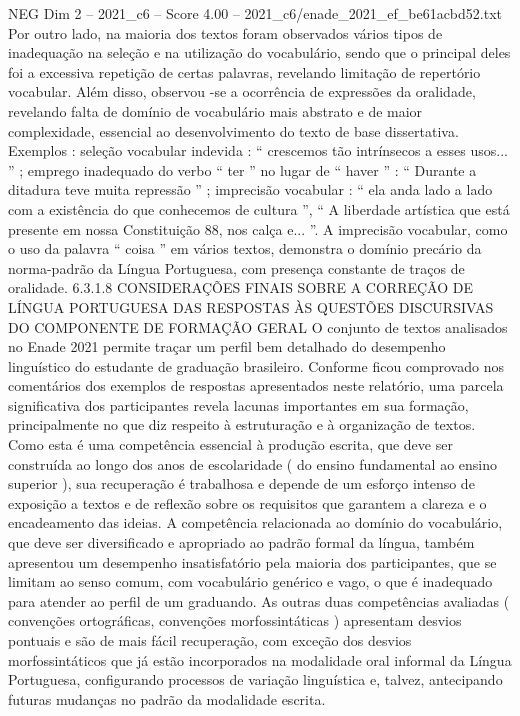 \begin{textsample}{NEG Dim 2 – 2021\_c6 – Score 4.00 – 2021\_c6/enade\_2021\_ef\_be61acbd52.txt}
Por outro lado, na maioria dos textos foram observados vários tipos de inadequação na seleção e na utilização do vocabulário, sendo que o principal deles foi a excessiva repetição de certas palavras, revelando limitação de repertório vocabular.
Além disso, observou -se a ocorrência de expressões da oralidade, revelando falta de domínio de vocabulário mais abstrato e de maior complexidade, essencial ao desenvolvimento do texto de base dissertativa.
Exemplos : seleção vocabular indevida : “ crescemos tão intrínsecos a esses usos... ” ; emprego inadequado do verbo “ ter ” no lugar de “ haver ” : “ Durante a ditadura teve muita repressão ” ; imprecisão vocabular : “ ela anda lado a lado com a existência do que conhecemos de cultura ”, “ A liberdade artística que está presente em nossa Constituição 88, nos calça e... ”.
A imprecisão vocabular, como o uso da palavra “ coisa ” em vários textos, demonstra o domínio precário da norma-padrão da Língua Portuguesa, com presença constante de traços de oralidade. 6.3.1.8 CONSIDERAÇÕES FINAIS SOBRE A CORREÇÃO DE LÍNGUA PORTUGUESA DAS RESPOSTAS ÀS QUESTÕES DISCURSIVAS DO COMPONENTE DE FORMAÇÃO GERAL O conjunto de textos analisados no Enade 2021 permite traçar um perfil bem detalhado do desempenho linguístico do estudante de graduação brasileiro.
Conforme ficou comprovado nos comentários dos exemplos de respostas apresentados neste relatório, uma parcela significativa dos participantes revela lacunas importantes em sua formação, principalmente no que diz respeito à estruturação e à organização de textos.
Como esta é uma competência essencial à produção escrita, que deve ser construída ao longo dos anos de escolaridade ( do ensino fundamental ao ensino superior ), sua recuperação é trabalhosa e depende de um esforço intenso de exposição a textos e de reflexão sobre os requisitos que garantem a clareza e o encadeamento das ideias.
A competência relacionada ao domínio do vocabulário, que deve ser diversificado e apropriado ao padrão formal da língua, também apresentou um desempenho insatisfatório pela maioria dos participantes, que se limitam ao senso comum, com vocabulário genérico e vago, o que é inadequado para atender ao perfil de um graduando.
As outras duas competências avaliadas ( convenções ortográficas, convenções morfossintáticas ) apresentam desvios pontuais e são de mais fácil recuperação, com exceção dos desvios morfossintáticos que já estão incorporados na modalidade oral informal da Língua Portuguesa, configurando processos de variação linguística e, talvez, antecipando futuras mudanças no padrão da modalidade escrita.

\end{textsample}
